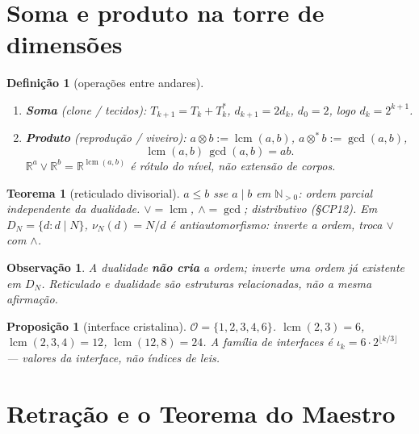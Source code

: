 \documentclass[11pt,a4paper]{article}
\newtheorem{definicao}{Definição}
\newtheorem{teorema}{Teorema}
\newtheorem{proposicao}{Proposição}
\newtheorem{observacao}{Observação}
\begin{document}
\section{Soma e produto na torre de dimensões}

\begin{definicao}[operações entre andares]\label{def:somaprod}
\begin{enumerate}
\item \textbf{Soma} (clone / tecidos):
$T_{k+1}=T_k+T_k^{*}$, $d_{k+1}=2d_k$, $d_0=2$, logo $d_k=2^{k+1}$.
\item \textbf{Produto} (reprodução / viveiro):
$a\otimes b:=\operatorname{lcm}(a,b)$,
$a\otimes^{*}b:=\operatorname{gcd}(a,b)$,
\[
\boxed{\operatorname{lcm}(a,b)\,\operatorname{gcd}(a,b)=ab.}
\]
$\mathbb{R}^{a}\vee\mathbb{R}^{b}=\mathbb{R}^{\operatorname{lcm}(a,b)}$
é rótulo do nível, não extensão de corpos.
\end{enumerate}
\end{definicao}

\begin{teorema}[reticulado divisorial]\label{thm:reticulo}
$a\le b$ sse $a\mid b$ em $\mathbb{N}_{>0}$: ordem parcial
independente da dualidade. $\vee=\operatorname{lcm}$,
$\wedge=\operatorname{gcd}$; distributivo (§CP12). Em
$D_N=\{d:d\mid N\}$, $\nu_N(d)=N/d$ é antiautomorfismo:
inverte a ordem, troca $\vee$ com $\wedge$.
\end{teorema}

\begin{observacao}
A dualidade \textbf{não cria} a ordem; inverte uma ordem já existente
em $D_N$. Reticulado e dualidade são estruturas relacionadas, não a
mesma afirmação.
\end{observacao}

\begin{proposicao}[interface cristalina]\label{prop:iface}
$\mathcal{O}=\{1,2,3,4,6\}$.
$\operatorname{lcm}(2,3)=6$,
$\operatorname{lcm}(2,3,4)=12$,
$\operatorname{lcm}(12,8)=24$.
A família de interfaces é
$\iota_k=6\cdot2^{\lfloor k/3\rfloor}$ --- valores da
\emph{interface}, não índices de leis.
\end{proposicao}

\section{Retração e o Teorema do Maestro}\label{sec:maestro-thm}
\end{document}
